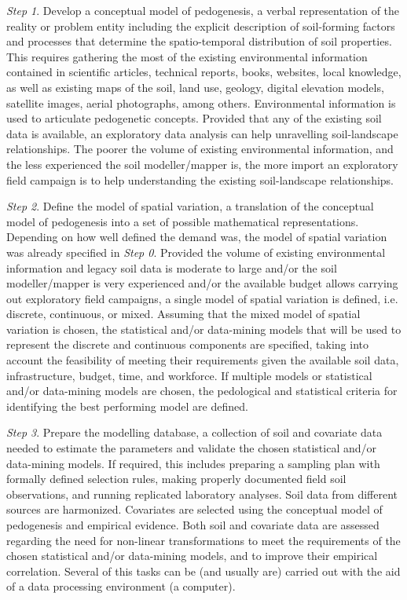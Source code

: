 \noindent\textit{Step 1}. Develop a conceptual model of pedogenesis, a verbal representation of the 
reality or problem entity including the explicit description of soil-forming factors and processes 
that determine the spatio-temporal distribution of soil properties. This requires gathering the most
of the existing environmental information contained in scientific articles, technical reports, 
books, websites, local knowledge, as well as existing maps of the soil, land use, geology, digital 
elevation models, satellite images, aerial photographs, among others. Environmental information is used
to articulate pedogenetic concepts. Provided that any of the existing soil data is available, an 
exploratory data analysis can help unravelling soil-landscape relationships. The poorer the volume of 
existing environmental information, and the less experienced the soil modeller/mapper is, the more 
import an exploratory field campaign is to help understanding the existing soil-landscape relationships.

\noindent\textit{Step 2}. Define the model of spatial variation, a translation of the conceptual 
model of pedogenesis into a set of possible mathematical representations. Depending on 
how well defined the demand was, the model of spatial variation was already specified in 
\textit{Step 0}. Provided the volume of existing environmental information and legacy soil data is 
moderate to large and/or the soil modeller/mapper is very experienced and/or the available budget 
allows carrying out exploratory field campaigns, a single model of spatial variation is 
defined, i.e. discrete, continuous, or mixed. Assuming that the mixed model of spatial variation is 
chosen, the statistical and/or data-mining models that will be used to represent the discrete 
and continuous components are specified, taking into account the feasibility of meeting their 
requirements given the available soil data, infrastructure, budget, time, and workforce. If multiple
models or statistical and/or data-mining models are chosen, the pedological and 
statistical criteria for identifying the best performing model are defined.

\noindent\textit{Step 3}. Prepare the modelling database, a collection of soil and covariate data 
needed to estimate the parameters and validate the chosen statistical and/or data-mining
models. If required, this includes preparing a sampling plan with formally defined selection rules, 
making properly documented field soil observations, and running replicated laboratory analyses. 
Soil data from different sources are harmonized. Covariates are selected using the conceptual model 
of pedogenesis and empirical evidence. Both soil and covariate data are assessed regarding the need 
for non-linear transformations to meet the requirements of the chosen statistical and/or 
data-mining models, and to improve their empirical correlation. Several of this tasks can be (and 
usually are) carried out with the aid of a data processing environment (a computer).

